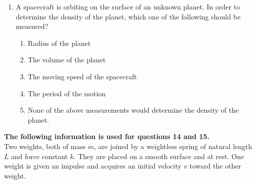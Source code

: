 \documentclass[12pt,letterpaper]{article}
\begin{document}
\begin{enumerate}[resume]
\item
A spacecraft is orbiting on the surface of an unknown planet. In order to determine the density of the planet, which one of the following should be measured?
\begin{enumerate}
\item Radius of the planet
\item The volume of the planet
\item The moving speed of the spacecraft
\item The period of the motion
\item None of the above measurements would determine the density of the planet.
\end{enumerate}
\end{enumerate}

\vfill
\newpage

\textbf{The following information is used for questions 14 and 15.}\\
Two weights, both of mass $m$, are joined by a weightless spring of natural length $L$ and force constant $k$. They are placed on a smooth surface and at rest. One weight is given an impulse and acquires an initial velocity $v$ toward the other weight.
\end{document}
